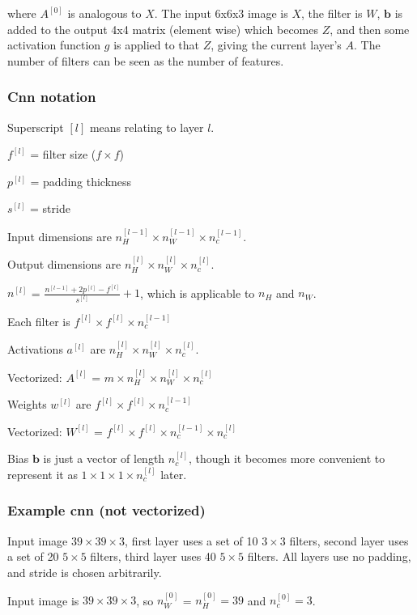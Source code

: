 \documentclass[12pt]{article}
\begin{document}
where $A^{[0]}$ is analogous to $X$. The input 6x6x3 image is $X$, the filter is $W$,
$\bm b$ is added to the output 4x4 matrix (element wise) which becomes $Z$, and then some
activation function $g$ is applied to that $Z$, giving the current layer's $A$. The number
of filters can be seen as the number of features.

\subsubsection{Cnn notation}

Superscript $[l]$ means relating to layer $l$.

$f^{[l]}$ = filter size ($f \times f$)

$p^{[l]}$ = padding thickness

$s^{[l]}$ = stride

Input dimensions are $n_H^{[l-1]} \times n_W^{[l-1]} \times n_c^{[l-1]}$.

Output dimensions are $n_H^{[l]} \times n_W^{[l]} \times n_c^{[l]}$.

$n^{[l]}$ = $\frac{n^{[l-1]}+2p^{[l]}-f^{[l]}}{s^{[l]}} + 1$, which is applicable to $n_H$ and $n_W$.

Each filter is $f^{[l]} \times f^{[l]} \times n_c^{[l-1]}$

Activations $a^{[l]}$ are $n_H^{[l]} \times n_W^{[l]} \times n_c^{[l]}$.

Vectorized: $A^{[l]}$ = $m \times n_H^{[l]} \times n_W^{[l]} \times n_c^{[l]}$

Weights $w^{[l]}$ are $f^{[l]} \times f^{[l]} \times n_c^{[l-1]}$

Vectorized: $W^{[l]}$ = $f^{[l]} \times f^{[l]} \times n_c^{[l-1]} \times n_c^{[l]}$

Bias $\bm b$ is just a vector of length $n_c^{[l]}$, though it becomes more convenient
to represent it as $1 \times 1 \times 1 \times n_c^{[l]}$ later.

\subsubsection{Example cnn (not vectorized)}

Input image $39 \times 39 \times 3$, first layer uses a set of 10 $3 \times 3$ filters,
second layer uses a set of 20 $5 \times 5$ filters, third layer uses 40 $5 \times 5$
filters. All layers use no padding, and stride is chosen arbitrarily.

Input image is $39 \times 39 \times 3$, so $n_W^{[0]}$ = $n_H^{[0]} = 39$
and $n_c^{[0]} = 3$.
\end{document}
